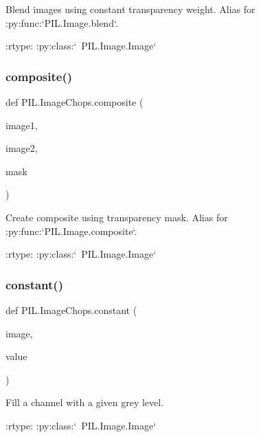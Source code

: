 \begin{DoxyVerb}Blend images using constant transparency weight. Alias for
:py:func:`PIL.Image.blend`.

:rtype: :py:class:`~PIL.Image.Image`
\end{DoxyVerb}
 \mbox{\label{namespacePIL_1_1ImageChops_a92bc38d251b6fb8d2c87a284b3b500ed}} 
\subsubsection{\texorpdfstring{composite()}{composite()}}
{\footnotesize\ttfamily def P\+I\+L.\+Image\+Chops.\+composite (\begin{DoxyParamCaption}\item[{}]{image1,  }\item[{}]{image2,  }\item[{}]{mask }\end{DoxyParamCaption})}

\begin{DoxyVerb}Create composite using transparency mask. Alias for
:py:func:`PIL.Image.composite`.

:rtype: :py:class:`~PIL.Image.Image`
\end{DoxyVerb}
 \mbox{\label{namespacePIL_1_1ImageChops_a0a5d85803c6f9839917b8b75aaf86995}} 
\subsubsection{\texorpdfstring{constant()}{constant()}}
{\footnotesize\ttfamily def P\+I\+L.\+Image\+Chops.\+constant (\begin{DoxyParamCaption}\item[{}]{image,  }\item[{}]{value }\end{DoxyParamCaption})}

\begin{DoxyVerb}Fill a channel with a given grey level.

:rtype: :py:class:`~PIL.Image.Image`
\end{DoxyVerb}
 \mbox{\label{namespacePIL_1_1ImageChops_abf079eadb4a8045416910230e4379c01}} 
